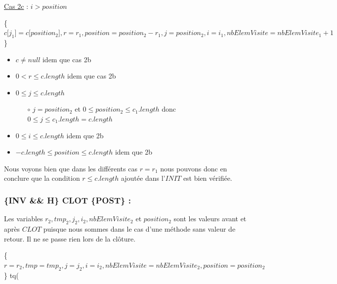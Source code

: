 \newpage
	\begin{description}
		\item \underline{Cas 2c} : $i > position$		
	\end{description}	

	\mbox{\{$c{[}j_1{]}=c{[}position_2{]}, r=r_1, position=position_2 - r_1, j=position_2,i=i_1, nbElemVisite=nbElemVisite_1 + 1$\}}\\


	\begin{itemize}
		\item $c \neq null$ idem que cas 2b	
		\item $0 < r \leq c.length$ idem que cas 2b
		\item $0 \leq j \leq c.length$
		\begin{itemize}
			\item[$\circ$] $j=position_2$ et $0 \leq position_2 \leq c_1.length$ donc $0 \leq j \leq c_1.length=c.length$	
		\end{itemize}	
		\item $0 \leq i \leq c.length$ idem que 2b
		\item $-c.length \leq position \leq c.length$ idem que 2b
	\end{itemize}

Nous voyons bien que dans les différents cas $r=r_1$ nous pouvons donc en conclure que la condition $r \leq c.length$ ajoutée dans l’$INIT$ est bien vérifiée.


	\subsubsection{\{INV \&\& H\} CLOT \{POST\} :}	

Les variables $r_2, tmp_2, j_2, i_2, nbElemVisite_2$ et $position_2$ sont les valeurs avant et après $CLOT$ puisque nous sommes dans le cas d’une méthode sans valeur de retour. Il ne se passe rien lors de la clôture.

		\begin{description}
			\item[\{$r=r_2, tmp = tmp_2, j = j_2, i = i_2, nbElemVisite = nbElemVisite_2, position=position_2 $\} tq(] 
		\end{description}	

